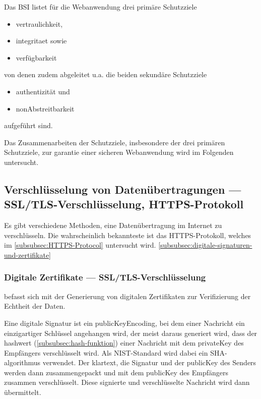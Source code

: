 Das \ac{BSI} listet für die Webanwendung drei primäre Schutzziele
\begin{samepage}
\begin{itemize}
    \item \gls{vertraulichkeit},
    \item \gls{integritaet} sowie
    \item \gls{verfügbarkeit}
\end{itemize}
\end{samepage}
von denen zudem abgeleitet u.a. die beiden sekundäre Schutzziele
\begin{samepage}
    \begin{itemize}
        \item \gls{authentizität} und 
        \item \gls{nonAbstreitbarkeit}
    \end{itemize}
\end{samepage}
aufgeführt sind\autocite[\pagef~8]{bsi_leitfaden_2022}.

Das Zusammenarbeiten der Schutzziele, insbesondere der drei primären Schutzziele, zur garantie einer sicheren Webanwendung wird im Folgenden untersucht.

\subsection[Verschlüsselung von Datenübertragungen]{Verschlüsselung von Datenübertragungen — \ac{SSL}/\ac{TLS}-Verschlüsselung, \ac{HTTPS}-Protokoll}

Es gibt verschiedene Methoden, eine Datenübertragung im Internet zu verschlüsseln. Die wahrscheinlich bekannteste ist das \ac{HTTPS}-Protokoll, welches im \autoref{subsubsec:HTTPS-Protocol} untersucht wird. \autoref{subsubsec:digitale-signaturen-und-zertifikate}

\subsubsection[Digitale Zertifikate]{Digitale Zertifikate — \ac{SSL}/\ac{TLS}-Verschlüsselung}\label{subsubsec:digitale-signaturen-und-zertifikate} befasst sich mit der Generierung von digitalen Zertifikaten zur Verifizierung der Echtheit der Daten.

Eine digitale Signatur ist ein \gls{publicKeyEncoding}, bei dem einer Nachricht ein einzigartiger Schlüssel angehangen wird, der meist daraus generiert wird, dass der \gls{hashwert} (\autoref{subsubsec:hash-funktion}) einer Nachricht mit dem \gls{privateKey} des Empfängers verschlüsselt wird\autocite[\pagef~297]{6391693}. Als \ac{NIST}-Standard wird dabei ein \ac{SHA}-\gls{algorithmus} verwendet.
Der \gls{klartext}, die Signatur und der \gls{publicKey} des Senders werden dann zusammengepackt und mit dem \gls{publicKey} des Empfängers zusammen verschlüsselt. Diese signierte und verschlüsselte Nachricht wird dann übermittelt.\autocite[\pagef~297]{6391693}

